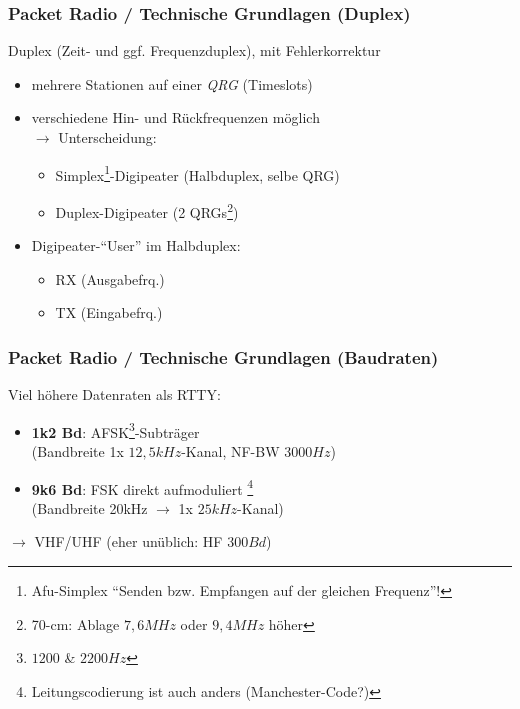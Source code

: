 \begin{frame}
  \frametitle{Packet Radio / Technische Grundlagen (Duplex)}

  Duplex (Zeit- und ggf. Frequenzduplex), mit Fehlerkorrektur

  \begin{itemize}
    \item mehrere Stationen auf einer \emph{QRG} (Timeslots)
    \item verschiedene Hin- und Rückfrequenzen möglich \\ $\rightarrow$
      Unterscheidung:
      \begin{itemize}
        \item Simplex\footnote{Afu-Simplex ``Senden bzw. Empfangen auf
          der gleichen Frequenz''!}-Digipeater (Halbduplex, selbe QRG)
        \item Duplex-Digipeater (2 QRGs\footnote{70-cm: Ablage $7,6 MHz$
          oder $9,4 MHz$ höher})
      \end{itemize}
    \item Digipeater-``User'' im Halbduplex:
      \begin{itemize}
        \item RX (Ausgabefrq.)
        \item TX (Eingabefrq.)
      \end{itemize}
  \end{itemize}

\end{frame}

\begin{frame}
  \frametitle{Packet Radio / Technische Grundlagen (Baudraten)}

  Viel höhere Datenraten als RTTY:

  \begin{itemize}
    \item \textbf{1k2 Bd}: AFSK\footnote{$1200$ \& $2200 Hz$}-Subträger \\
      (Bandbreite 1x $12,5kHz$-Kanal, NF-BW $3000 Hz$)
    \item \textbf{9k6 Bd}: FSK direkt aufmoduliert
      \footnote{Leitungscodierung ist auch anders (Manchester-Code?)} \\
      (Bandbreite 20kHz $\rightarrow$ 1x $25kHz$-Kanal)
  \end{itemize}

  $\rightarrow$ VHF/UHF (eher unüblich: HF $300 Bd$)

\end{frame}

